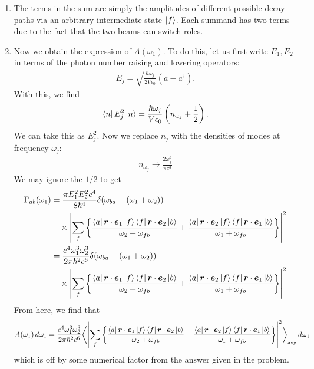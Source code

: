 \documentclass{article}
\theoremstyle{definition}
\newcommand{\f}[2]{\frac{#1}{#2}}
\newcommand{\lp}{\left(}
\newcommand{\rp}{\right)}
\newcommand{\lc}{\left\{}
\newcommand{\rc}{\right\}}
\begin{document}
\begin{enumerate}
\begin{enumerate}[label=(\roman*)]
		
		
		\item The terms in the sum are simply the amplitudes of different possible decay paths via an arbitrary intermediate state $\ket{f}$. Each summand has two terms due to the fact that the two beams can switch roles.
		
		\item Now we obtain the expression of $A(\omega_1)$. To do this, let us first write $E_1,E_2$ in terms of the photon number raising and lowering operators:
		\begin{align*}
		E_j = \sqrt{\f{\hbar \omega_j}{2 V \epsilon_0}}(a - a^\dagger).
		\end{align*}
		With this, we find 
		\begin{align*}
		\bra{n} E_j^2 \ket{n} = \f{\hbar \omega_j}{V\epsilon_0} \lp n_{\omega_j} + \f{1}{2} \rp.
		\end{align*}
		We can take this as $E_j^2$. Now we replace $n_j$ with the densities of modes at frequency $\omega_j$:
		\begin{align*}
		n_{\omega_j} \to \f{2\omega_j^3}{\pi c^3}
		\end{align*}
		We may ignore the $1/2$ to get
		\begin{align*}
		\Gamma_{ab}(\omega_1) &= \f{\pi E_1^2 E_2^2 e^4}{8\hbar^4}\delta(\omega_{ba} - (\omega_1 + \omega_2)) \\
		&\quad \times \abs{ \sum_f 
			\lc 
			\f{\bra{a} \bm{r}\cdot \bm{e}_1\ket{f}\bra{f} \bm{r}\cdot {\bm{e}}_2 \ket{b}}{\omega_2 + \omega_{fb}} + 
			\f{\bra{a} \bm{r}\cdot \bm{e}_2\ket{f}\bra{f} \bm{r}\cdot {\bm{e}}_1 \ket{b}}{\omega_{1} + \omega_{fb}}
			\rc }^2\\
		&= \f{e^4\omega_1^3 \omega_2^3}{2\pi \hbar^2 c^6}\delta(\omega_{ba} - (\omega_1 + \omega_2)) \\
		&\quad \times \abs{ \sum_f 
			\lc 
			\f{\bra{a} \bm{r}\cdot \bm{e}_1\ket{f}\bra{f} \bm{r}\cdot {\bm{e}}_2 \ket{b}}{\omega_2 + \omega_{fb}} + 
			\f{\bra{a} \bm{r}\cdot \bm{e}_2\ket{f}\bra{f} \bm{r}\cdot {\bm{e}}_1 \ket{b}}{\omega_{1} + \omega_{fb}}
			\rc }^2
		\end{align*}
		From here, we find that
		\begin{align*}
		A(\omega_1)\,d\omega_1 = \f{e^4\omega_1^3 \omega_2^3}{2\pi \hbar^2 c^6} \bigg\langle \abs{\sum_f \lc \f{\bra{a} \bm{r}\cdot \bm{e}_1\ket{f}\bra{f} \bm{r}\cdot {\bm{e}}_2 \ket{b}}{\omega_2 + \omega_{fb}} + 
			\f{\bra{a} \bm{r}\cdot \bm{e}_2\ket{f}\bra{f} \bm{r}\cdot {\bm{e}}_1 \ket{b}}{\omega_{1} + \omega_{fb}} \rc  }^2 \bigg\rangle_\text{avg}\,d\omega_1
		\end{align*}
		which is off by some numerical factor from the answer given in the problem. 
		

\end{enumerate}
\end{enumerate}
\end{document}
